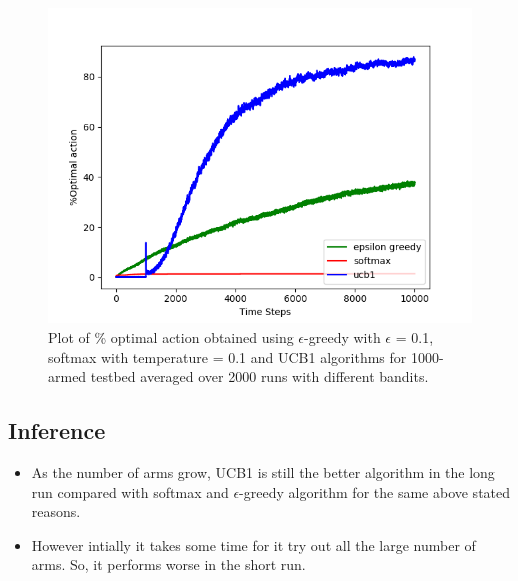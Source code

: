 \documentclass[english]{article}
\begin{document}
\begin{figure}[H]
    \centering
    \includegraphics[width=\linewidth]{plot_1000arms_opt.png}
    \caption{Plot of \% optimal action obtained using $\epsilon$-greedy with $\epsilon$ = 0.1, softmax with temperature = 0.1 and UCB1 algorithms for 1000-armed testbed averaged over 2000 runs with different bandits.}
    \label{fig:eg1}
\end{figure}
\subsection{Inference}
\begin{itemize}
    \item As the number of arms grow, UCB1 is still the better algorithm in the long run compared with softmax and $\epsilon$-greedy algorithm for the same above stated reasons.
    \item However intially it takes some time for it try out all the large number of arms. So, it performs worse in the short run.
\end{itemize}
\end{document}
